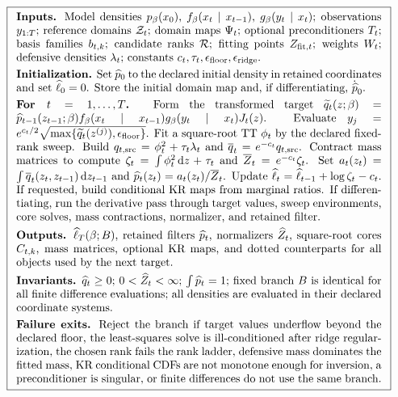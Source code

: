 \documentclass[11pt]{article}
\numberwithin{equation}{section}
\newcommand{\dd}{\,\mathrm d}
\begin{document}
\begin{equation}
\boxed{
\begin{array}{p{0.94\linewidth}}
\textbf{Inputs.}
Model densities \(p_\beta(x_0)\), \(f_\beta(x_t\mid x_{t-1})\),
\(g_\beta(y_t\mid x_t)\); observations \(y_{1:T}\); reference domains
\(\mathcal Z_t\); domain maps \(\Psi_t\); optional preconditioners \(T_t\);
basis families \(b_{t,k}\); candidate ranks \(\mathcal R\); fitting points
\(Z_{{\rm fit},t}\); weights \(W_t\); defensive densities \(\lambda_t\);
constants \(c_t,\tau_t,\epsilon_{\rm floor},\epsilon_{\rm ridge}\).
\\[1mm]
\textbf{Initialization.}
Set \(\widehat p_0\) to the declared initial density in retained coordinates
and set \(\widehat\ell_0=0\).  Store the initial domain map and, if
differentiating, \(\dot{\widehat p}_0\).
\\[1mm]
\textbf{For \(t=1,\ldots,T\).}
Form the transformed target
\(\widetilde q_t(z;\beta)=\widehat p_{t-1}(z_{t-1};\beta)
f_\beta(x_t\mid x_{t-1})g_\beta(y_t\mid x_t)J_t(z)\).
Evaluate \(y_j=e^{c_t/2}\sqrt{\max\{\widetilde q_t(z^{(j)}),\epsilon_{\rm floor}\}}\).
Fit a square-root TT \(\phi_t\) by the declared fixed-rank sweep.
Build
\(q_{t,{\rm src}}=\phi_t^2+\tau_t\lambda_t\) and
\(\overline q_t=e^{-c_t}q_{t,{\rm src}}\).
Contract mass matrices to compute
\(\zeta_t=\int\phi_t^2\dd z+\tau_t\) and
\(\overline Z_t=e^{-c_t}\zeta_t\).
Set
\(a_t(z_t)=\int \overline q_t(z_t,z_{t-1})\dd z_{t-1}\) and
\(\widehat p_t(z_t)=a_t(z_t)/\overline Z_t\).
Update \(\widehat\ell_t=\widehat\ell_{t-1}+\log\zeta_t-c_t\).
If requested, build conditional KR maps from marginal ratios.
If differentiating, run the derivative pass through target values, sweep
environments, core solves, mass contractions, normalizer, and retained filter.
\\[1mm]
\textbf{Outputs.}
\(\widehat\ell_T(\beta;B)\), retained filters
\(\widehat p_t\), normalizers \(\widehat Z_t\), square-root cores \(C_{t,k}\),
mass matrices, optional KR maps, and dotted counterparts for all objects used
by the next target.
\\[1mm]
\textbf{Invariants.}
\(\widehat q_t\ge0\); \(0<\widehat Z_t<\infty\);
\(\int \widehat p_t=1\); fixed branch \(B\) is identical for all finite
difference evaluations; all densities are evaluated in their declared
coordinate systems.
\\[1mm]
\textbf{Failure exits.}
Reject the branch if target values underflow beyond the declared floor,
the least-squares solve is ill-conditioned after ridge regularization, the
chosen rank fails the rank ladder, defensive mass dominates the fitted mass,
KR conditional CDFs are not monotone enough for inversion, a preconditioner is
singular, or finite differences do not use the same branch.
\end{array}}
\label{eq:p24-boxed-filter}
\end{equation}
\end{document}
